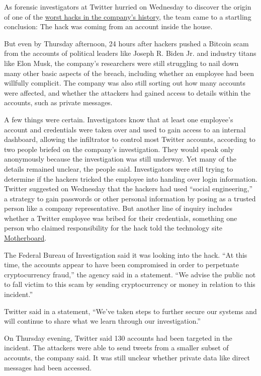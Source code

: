 As forensic investigators at Twitter hurried on Wednesday to discover
the origin of one of the
\href{https://www.nytimes.com/2020/07/17/technology/twitter-hackers-interview.html}{worst
hacks in the company's history}, the team came to a startling
conclusion: The hack was coming from an account inside the house.

But even by Thursday afternoon, 24 hours after hackers pushed a Bitcoin
scam from the accounts of political leaders like Joseph R. Biden Jr. and
industry titans like Elon Musk, the company's researchers were still
struggling to nail down many other basic aspects of the breach,
including whether an employee had been willfully complicit. The company
was also still sorting out how many accounts were affected, and whether
the attackers had gained access to details within the accounts, such as
private messages.

A few things were certain. Investigators know that at least one
employee's account and credentials were taken over and used to gain
access to an internal dashboard, allowing the infiltrator to control
most Twitter accounts, according to two people briefed on the company's
investigation. They would speak only anonymously because the
investigation was still underway. Yet many of the details remained
unclear, the people said. Investigators were still trying to determine
if the hackers tricked the employee into handing over login information.
Twitter suggested on Wednesday that the hackers had used ``social
engineering,'' a strategy to gain passwords or other personal
information by posing as a trusted person like a company representative.
But another line of inquiry includes whether a Twitter employee was
bribed for their credentials, something one person who claimed
responsibility for the hack told the technology site
\href{https://www.vice.com/en_us/article/jgxd3d/twitter-insider-access-panel-account-hacks-biden-uber-bezos}{Motherboard}.

The Federal Bureau of Investigation said it was looking into the hack.
``At this time, the accounts appear to have been compromised in order to
perpetuate cryptocurrency fraud,'' the agency said in a statement. ``We
advise the public not to fall victim to this scam by sending
cryptocurrency or money in relation to this incident.''

Twitter said in a statement, ``We've taken steps to further secure our
systems and will continue to share what we learn through our
investigation.''

On Thursday evening, Twitter said 130 accounts had been targeted in the
incident. The attackers were able to send tweets from a smaller subset
of accounts, the company said. It was still unclear whether private data
like direct messages had been accessed.

